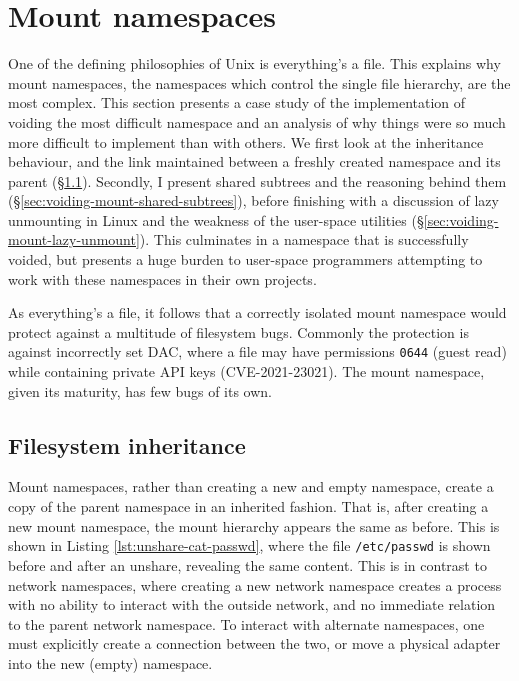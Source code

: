 \documentclass[12pt,a4paper,twoside]{report}
\begin{document}
\section{Mount namespaces}
\label{sec:voiding-mount}

One of the defining philosophies of Unix is everything's a file. This explains why mount namespaces, the namespaces which control the single file hierarchy, are the most complex. This section presents a case study of the implementation of voiding the most difficult namespace and an analysis of why things were so much more difficult to implement than with others. We first look at the inheritance behaviour, and the link maintained between a freshly created namespace and its parent (§\ref{sec:voiding-mount-inherited}). Secondly, I present shared subtrees and the reasoning behind them (§\ref{sec:voiding-mount-shared-subtrees}), before finishing with a discussion of lazy unmounting in Linux and the weakness of the user-space utilities (§\ref{sec:voiding-mount-lazy-unmount}). This culminates in a namespace that is successfully voided, but presents a huge burden to user-space programmers attempting to work with these namespaces in their own projects.

As everything's a file, it follows that a correctly isolated mount namespace would protect against a multitude of filesystem bugs. Commonly the protection is against incorrectly set DAC, where a file may have permissions \texttt{0644} (guest read) while containing private API keys (CVE-2021-23021). The mount namespace, given its maturity, has few bugs of its own.

\subsection{Filesystem inheritance}
\label{sec:voiding-mount-inherited}
 
Mount namespaces, rather than creating a new and empty namespace, create a copy of the parent namespace in an inherited fashion. That is, after creating a new mount namespace, the mount hierarchy appears the same as before. This is shown in Listing \ref{lst:unshare-cat-passwd}, where the file \texttt{/etc/passwd} is shown before and after an unshare, revealing the same content. This is in contrast to network namespaces, where creating a new network namespace creates a process with no ability to interact with the outside network, and no immediate relation to the parent network namespace. To interact with alternate namespaces, one must explicitly create a connection between the two, or move a physical adapter into the new (empty) namespace.
\end{document}

